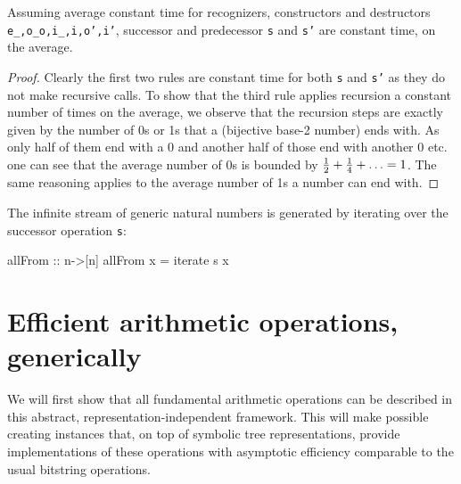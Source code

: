 \documentclass{TOOLS/llncs}
\begin{document}
\begin{prop}
Assuming average constant time for recognizers, constructors and destructors {\tt e\_,o\_o,i\_,i,o',i'}, successor
and predecessor {\tt s} and {\tt s'} are constant time, on the average.
\end{prop}
\begin{proof}
Clearly the first two  rules are constant time for both {\tt s} and {\tt s'} as they do not make recursive calls. 
To show that the third rule applies recursion a
constant number of times on the average, we observe that the recursion steps are exactly given by the number of 0s or 1s
that a (bijective base-2 number) ends with. As only half of them end with a 0 and another half of those end with another 0
etc. one can see that the average number of 0s is bounded by ${1 \over 2}+{1 \over 4}+ \ldots=1$. The same reasoning
applies to the average number of 1s a number can end with.
\end{proof}
The infinite stream of generic natural numbers is generated 
by iterating over the successor operation {\tt s}:
\begin{code}
  allFrom :: n->[n]
  allFrom x = iterate s x
\end{code}

\section{Efficient arithmetic operations, generically} \label{gen}

We will first show that all fundamental arithmetic operations
can be described in this abstract, representation-independent framework. This
will make possible creating instances that, on top of
symbolic tree representations, provide implementations of these
operations with asymptotic efficiency comparable to the usual
bitstring operations.
\end{document}
